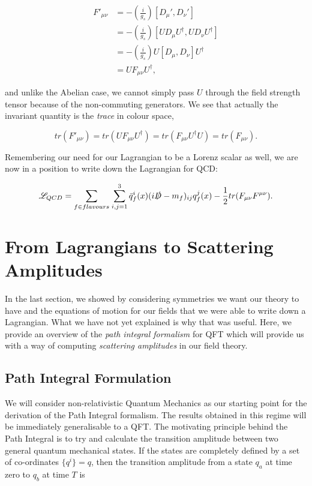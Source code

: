 \begin{equation}
\begin{split}
F'_{\mu \nu} &= -\left(\frac{i}{g_s} \right) [D_\mu', D_\nu'] \\
&= -\left(\frac{i}{g_s} \right) [U D_\mu U^\dagger, U D_\nu U^\dagger] \\
&= -\left(\frac{i}{g_s} \right) U [D_\mu, D_\nu]  U^\dagger \\
&=  U F_{\mu \nu}  U^\dagger,
\end{split}
\end{equation}

and unlike the Abelian case, we cannot simply pass $U$ through the field strength tensor because of the non-commuting generators. We see that actually the invariant quantity is the \emph{trace} in colour space,

\begin{equation}
tr(F'_{\mu \nu}) = tr(U F_{\mu \nu} U^\dagger) = tr(F_{\mu \nu}U^\dagger U) = tr(F_{\mu \nu}).
\end{equation}

Remembering our need for our Lagrangian to be a Lorenz scalar as well, we are now in a position to write down the Lagrangian for QCD:

\begin{equation}
\mathscr{L}_{QCD} = \sum_{f \in flavours} \hspace{1pt} \sum_{i,j = 1}^3 \bar{q}_f^i(x)(i \slashed{D} - m_f)_{ij}q^j_f(x) - \frac{1}{2}tr(F_{\mu \nu}F^{\mu \nu}).
\end{equation}

\section{From Lagrangians to Scattering Amplitudes}
In the last section, we showed by considering symmetries we want our theory to have and the equations of motion for our fields that we were able to write down a Lagrangian. What we have not yet explained is why that was useful. Here, we provide an overview of the \emph{path integral formalism} for QFT which will provide us with a way of computing \emph{scattering amplitudes} in our field theory. 

\subsection{Path Integral Formulation}

We will consider non-relativistic Quantum Mechanics as our starting point for the derivation of the Path Integral formalism. The results obtained in this regime will be immediately generalisable to a QFT. The motivating principle behind the Path Integral is to try and calculate the transition amplitude between two general quantum mechanical states. If the states are completely defined by a set of co-ordinates $\{q^i\} = q$, then the transition amplitude from a state $q_a$ at time zero to $q_b$ at time $T$ is

